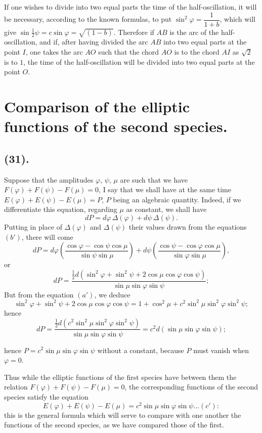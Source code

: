 \documentclass{article}
\begin{document}

If one wishes to divide into two equal parts the time of the half-oscillation, it will be necessary, according to the known formulas, to put $\sin^{2}\varphi=\dfrac{1}{1+b}$, which will give $\sin\frac{1}{2}\psi=c\sin\varphi=\sqrt{(1-b)}$. Therefore if $AB$ is the arc of the half-oscillation, and if, after having divided the arc $AB$ into two equal parts at the point $I$, one takes the arc $AO$ such that the chord $AO$ is to the chord $AI$ as $\sqrt{2}$ is to $1$, the time of the half-oscillation will be divided into two equal parts at the point $O$.

\section*{Comparison of the elliptic functions of the second species.}

\subsection*{(31).}

Suppose that the amplitudes $\varphi$, $\psi$, $\mu$ are such that we have $F(\varphi)+F(\psi)-F(\mu)=0$, I say that we shall have at the same time $E(\varphi)+E(\psi)-E(\mu)=P$, $P$ being an algebraic quantity. Indeed, if we differentiate this equation, regarding $\mu$ as constant, we shall have
\[ dP=d\varphi\,\Delta(\varphi)+d\psi\,\Delta(\psi). \]
Putting in place of $\Delta(\varphi)$ and $\Delta(\psi)$ their values drawn from the equations $(b')$, there will come
\[ dP=d\varphi\left(\frac{\cos\varphi-\cos\psi\cos\mu}{\sin\psi\sin\mu}\right)+d\psi\left(\frac{\cos\psi-\cos\varphi\cos\mu}{\sin\varphi\sin\mu}\right), \]
or
\[ dP=\frac{\tfrac{1}{2}d(\sin^{2}\varphi+\sin^{2}\psi+2\cos\mu\cos\varphi\cos\psi)}{\sin\mu\sin\varphi\sin\psi}; \]
But from the equation $(a')$, we deduce
\[ \sin^{2}\varphi+\sin^{2}\psi+2\cos\mu\cos\varphi\cos\psi=1+\cos^{2}\mu+c^{2}\sin^{2}\mu\sin^{2}\varphi\sin^{2}\psi; \]
hence
\[ dP=\frac{\tfrac{1}{2}d(c^{2}\sin^{2}\mu\sin^{2}\varphi\sin^{2}\psi)}{\sin\mu\sin\varphi\sin\psi}=c^{2}d(\sin\mu\sin\varphi\sin\psi); \]

hence $P=c^{2}\sin\mu\sin\varphi\sin\psi$ without a constant, because $P$ must vanish when $\varphi=0$.

Thus while the elliptic functions of the first species have between them the relation $F(\varphi)+F(\psi)-F(\mu)=0$, the corresponding functions of the second species satisfy the equation
\[ E(\varphi)+E(\psi)-E(\mu)=c^{2}\sin\mu\sin\varphi\sin\psi\ldots(c'): \]
this is the general formula which will serve to compare with one another the functions of the second species, as we have compared those of the first.
\end{document}
